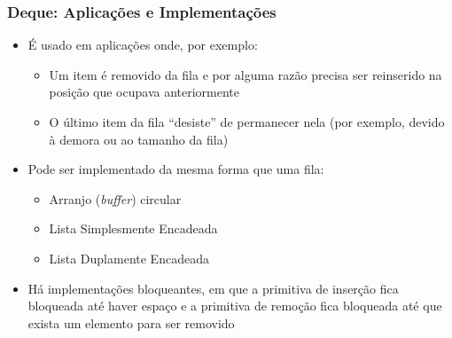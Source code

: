 \documentclass[aspectratio=169]{beamer}
\begin{document}
\begin{frame}\frametitle{Deque: Aplicações e Implementações}
\begin{itemize}
	\item É usado em aplicações onde, por exemplo:
	\begin{itemize}
		\item Um item é removido da fila e por alguma razão precisa ser reinserido na posição que ocupava anteriormente
		\item O último item da fila ``desiste'' de permanecer nela (por exemplo, devido à demora ou ao tamanho da fila)
	\end{itemize}
	\item Pode ser implementado da mesma forma que uma fila:
	\begin{itemize}
		\item Arranjo (\emph{buffer}) circular
		\item Lista Simplesmente Encadeada
		\item Lista Duplamente Encadeada
	\end{itemize}
	\item Há implementações bloqueantes, em que a primitiva de inserção fica bloqueada até haver espaço e a primitiva de remoção fica bloqueada até que exista um elemento para ser removido
\end{itemize}
\end{frame}
\end{document}
